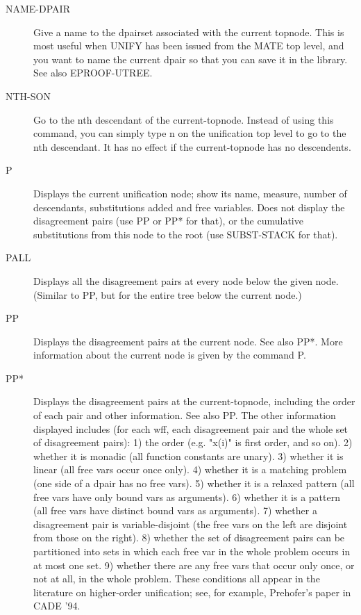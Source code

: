 \begin{description}
\item[NAME-DPAIR]  
Give a name to the dpairset associated with the current topnode.
This is most useful when UNIFY has been issued from the MATE top
level, and you want to name the current dpair so that you can save
it in the library. See also EPROOF-UTREE.

\item[NTH-SON]  
Go to the nth descendant of the current-topnode. Instead of
using this command, you can simply type n on the unification top level to
go to the nth descendant. It has no effect if the current-topnode has
no descendents.

\item[P]  
Displays the current unification node; show its name,
measure, number of descendants, substitutions added and free
variables. Does not display the disagreement pairs (use PP or
PP* for that), or the cumulative substitutions from this node 
to the root (use SUBST-STACK for that).

\item[PALL]  
Displays all the disagreement pairs at every node below the
given node. (Similar to PP, but for the entire tree below the current
node.)

\item[PP]  
Displays the disagreement pairs at the current node. See also PP*. 
More information about the current node is given by the command P.

\item[PP*]  
Displays the disagreement pairs at the current-topnode, including the order of
each pair and other information. See also PP. The other information displayed
includes (for each wff, each disagreement pair and the whole set of 
disagreement pairs):
1) the order (e.g. "x(i)" is first order, and so on).
2) whether it is monadic (all function constants are unary).
3) whether it is linear (all free vars occur once only).
4) whether it is a matching problem (one side of a dpair has no free vars).
5) whether it is a relaxed pattern (all free vars have only bound vars as
   arguments).
6) whether it is a pattern (all free vars have distinct bound vars as 
   arguments).
7) whether a disagreement pair is variable-disjoint (the free vars on the
   left are disjoint from those on the right).
8) whether the set of disagreement pairs can be partitioned into sets in 
   which each free var in the whole problem occurs in at most one set.
9) whether there are any free vars that occur only once, or not at all, in 
   the whole problem.
These conditions all appear in the literature on higher-order unification; 
see, for example, Prehofer's paper in CADE '94.


\end{description}
